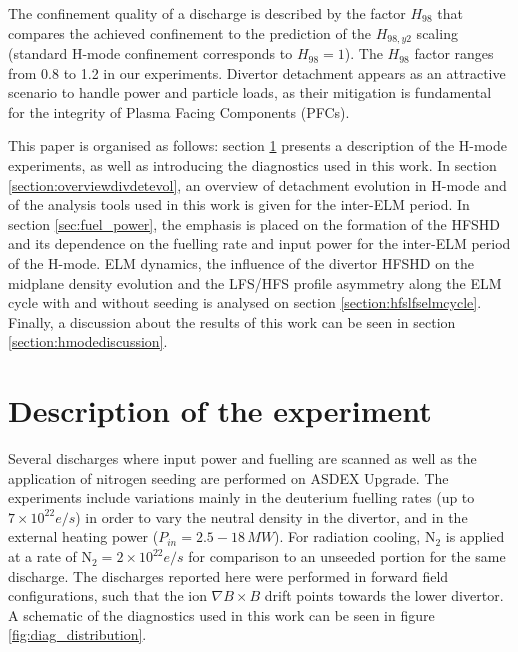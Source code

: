 \documentclass[12pt]{iopart}
\begin{document}
The confinement quality of a discharge is described by the factor $H_{98}$ that compares the achieved confinement to the prediction of the $H_{98,y2}$\cite{ITER1999} scaling (standard H-mode confinement corresponds to $H_{98} = 1$). The $H_{98}$ factor ranges from 0.8 to 1.2 in our experiments. Divertor detachment appears as an attractive scenario to handle power and particle loads, as their mitigation is fundamental for the integrity of Plasma Facing Components (PFCs).

This paper is organised as follows: section \ref{section:descriptionhmode} presents a description of the H-mode experiments, as well as introducing the diagnostics used in this work.
In section \ref{section:overviewdivdetevol}, an overview of detachment evolution in H-mode and of the analysis tools used in this work is given for the inter-ELM period. In section \ref{sec:fuel_power}, the emphasis is placed on the formation of the HFSHD and its dependence on the fuelling rate and input power for the inter-ELM period of the H-mode. ELM dynamics, the influence of the divertor HFSHD on the midplane density evolution and the LFS/HFS profile asymmetry along the ELM cycle with and without seeding is analysed on section \ref{section:hfslfselmcycle}. Finally, a discussion about the results of this work can be seen in section \ref{section:hmodediscussion}.

\section{Description of the experiment}
\label{section:descriptionhmode}

Several discharges where input power and fuelling are scanned as well as the application of nitrogen seeding are performed on ASDEX Upgrade. The experiments include variations mainly in the deuterium fuelling rates (up to $7\times 10^{22}e/s$) in order to vary the neutral density in the divertor, and in the external heating power ($P_{in} = 2.5-18\,MW$). For radiation cooling, $\mathrm{N_{2}}$ is applied at a rate of $\mathrm{N_{2}} = 2\times 10^{22}e/s$ for comparison to an unseeded portion for the same discharge. The discharges reported here were performed in forward field configurations, such that the ion $\nabla B\times B$ drift points towards the lower divertor. A schematic of the diagnostics used in this work can be seen in figure \ref{fig:diag_distribution}.
\end{document}
